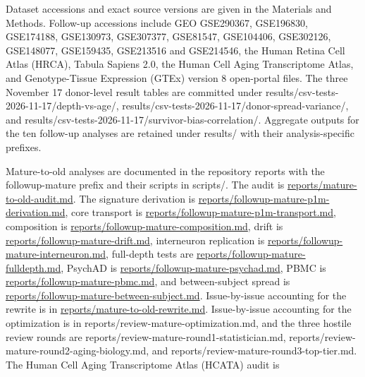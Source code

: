 \documentclass[11pt]{article}
\begin{document}
Dataset accessions and exact source versions are given in the Materials and Methods. Follow-up accessions include GEO GSE290367, GSE196830, GSE174188, GSE130973, GSE307377, GSE81547, GSE104406, GSE302126, GSE148077, GSE159435, GSE213516 and GSE214546, the Human Retina Cell Atlas (HRCA), Tabula Sapiens 2.0, the Human Cell Aging Transcriptome Atlas, and Genotype-Tissue Expression (GTEx) version 8 open-portal files. The three November 17 donor-level result tables are committed under results/csv-tests-2026-11-17/depth-vs-age/, results/csv-tests-2026-11-17/donor-spread-variance/, and results/csv-tests-2026-11-17/survivor-bias-correlation/. Aggregate outputs for the ten follow-up analyses are retained under results/ with their analysis-specific prefixes.

Mature-to-old analyses are documented in the repository reports with the followup-mature prefix and their scripts in scripts/. The audit is \href{https://github.com/Abolfazl-Alipour/agescape/blob/mature-to-old-final-2026-11-23/reports/mature-to-old-audit.md}{reports/mature-to-old-audit.md}. The signature derivation is \href{https://github.com/Abolfazl-Alipour/agescape/blob/mature-to-old-final-2026-11-23/reports/followup-mature-p1m-derivation.md}{reports/followup-mature-p1m-derivation.md}, core transport is \href{https://github.com/Abolfazl-Alipour/agescape/blob/mature-to-old-final-2026-11-23/reports/followup-mature-p1m-transport.md}{reports/followup-mature-p1m-transport.md}, composition is \href{https://github.com/Abolfazl-Alipour/agescape/blob/mature-to-old-final-2026-11-23/reports/followup-mature-composition.md}{reports/followup-mature-composition.md}, drift is \href{https://github.com/Abolfazl-Alipour/agescape/blob/mature-to-old-final-2026-11-23/reports/followup-mature-drift.md}{reports/followup-mature-drift.md}, interneuron replication is \href{https://github.com/Abolfazl-Alipour/agescape/blob/mature-to-old-final-2026-11-23/reports/followup-mature-interneuron.md}{reports/followup-mature-interneuron.md}, full-depth tests are \href{https://github.com/Abolfazl-Alipour/agescape/blob/mature-to-old-final-2026-11-23/reports/followup-mature-fulldepth.md}{reports/followup-mature-fulldepth.md}, PsychAD is \href{https://github.com/Abolfazl-Alipour/agescape/blob/mature-to-old-final-2026-11-23/reports/followup-mature-psychad.md}{reports/followup-mature-psychad.md}, PBMC is \href{https://github.com/Abolfazl-Alipour/agescape/blob/mature-to-old-final-2026-11-23/reports/followup-mature-pbmc.md}{reports/followup-mature-pbmc.md}, and between-subject spread is \href{https://github.com/Abolfazl-Alipour/agescape/blob/mature-to-old-final-2026-11-23/reports/followup-mature-between-subject.md}{reports/followup-mature-between-subject.md}. Issue-by-issue accounting for the rewrite is in \href{https://github.com/Abolfazl-Alipour/agescape/blob/mature-to-old-final-2026-11-23/reports/mature-to-old-rewrite.md}{reports/mature-to-old-rewrite.md}. Issue-by-issue accounting for the optimization is in reports/review-mature-optimization.md, and the three hostile review rounds are reports/review-mature-round1-statistician.md, reports/review-mature-round2-aging-biology.md, and reports/review-mature-round3-top-tier.md. The Human Cell Aging Transcriptome Atlas (HCATA) audit is 
\end{document}
